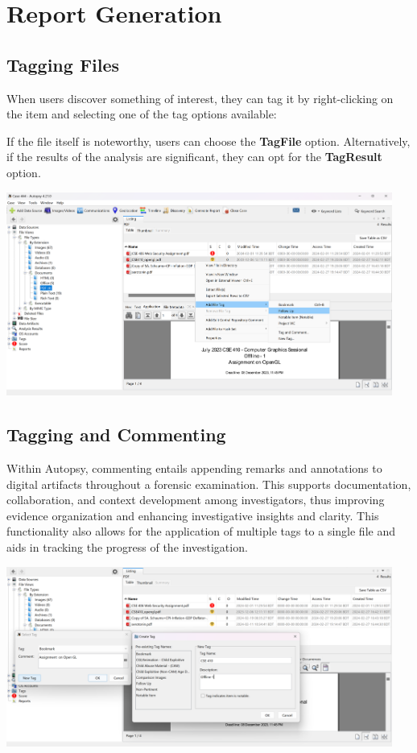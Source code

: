 \documentclass{article}
\begin{document}
\section{Report Generation}
\subsection{Tagging Files}

When users discover something of interest, they can tag it by right-clicking on the item and selecting one of the tag options available:

If the file itself is noteworthy, users can choose the \textbf{TagFile} option. Alternatively, if the results of the analysis are significant, they can opt for the \textbf{TagResult} option.

\begin{center}
    \includegraphics[width=0.95\textwidth]{5/5.1/Tagging.png}
\end{center}

\subsection{Tagging and Commenting}

Within Autopsy, commenting entails appending remarks and annotations to digital artifacts throughout a forensic examination. This supports documentation, collaboration, and context development among investigators, thus improving evidence organization and enhancing investigative insights and clarity. This functionality also allows for the application of multiple tags to a single file and aids in tracking the progress of the investigation.

\begin{center}
    \includegraphics[width=0.95\textwidth]{5/5.2/Tagging & Commenting.png}
\end{center}
\end{document}
